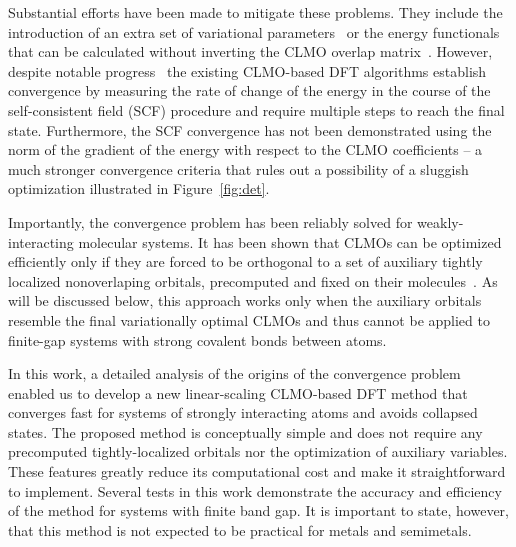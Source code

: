 \documentclass[10pt,amsmath,twocolumn,aps,prl,superscriptaddress,floatfix]{revtex4-1}
\begin{document}
Substantial efforts have been made to mitigate these problems. 
They include the introduction of an extra set of variational parameters~\cite{yang1997absolute,burger2008linear, peng2013effective} or the energy functionals that can be calculated without inverting the CLMO overlap matrix~\cite{mauri1993orbital,kim1995total,ordejon1995linear}. 
However, despite notable progress~\cite{fattebert2004linear, fattebert2006linear, osei2014accurate} the existing CLMO-based DFT algorithms establish convergence by measuring the rate of change of the energy in the course of the self-consistent field (SCF) procedure and require multiple steps to reach the final state. 
Furthermore, the SCF convergence has not been demonstrated using the norm of the gradient of the energy with respect to the CLMO coefficients -- a much stronger convergence criteria that rules out a possibility of a sluggish optimization illustrated in Figure~\ref{fig:det}.

Importantly, the convergence problem has been reliably solved for weakly-interacting molecular systems. 
It has been shown that CLMOs can be optimized efficiently only if they are forced to be orthogonal to a set of auxiliary tightly localized nonoverlaping orbitals, precomputed and fixed on their molecules~\cite{tsuchida2007augmented, tsuchida2008ab, khaliullin2013efficient}. 
As will be discussed below, this approach works only when the auxiliary orbitals resemble the final variationally optimal CLMOs and thus cannot be applied to finite-gap systems with strong covalent bonds between atoms. 

In this work, a detailed analysis of the origins of the convergence problem enabled us to develop a new linear-scaling CLMO-based DFT method that converges fast for systems of strongly interacting atoms and avoids collapsed states. The proposed method is conceptually simple and does not require any precomputed tightly-localized orbitals nor the optimization of auxiliary variables. These features greatly reduce its computational cost and make it straightforward to implement. Several tests in this work demonstrate the accuracy and efficiency of the method for systems with finite band gap. It is important to state, however, that this method is not expected to be practical for metals and semimetals.

\end{document}
